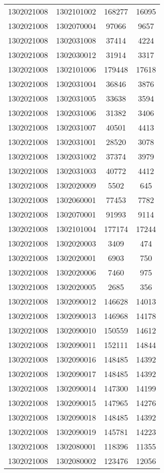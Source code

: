 \begin{longtable}[h]{llcc}
		1302021008 & 1302101002 & 168277 & 16095\\
		1302021008 & 1302070004 & 97066 & 9657\\
		1302021008 & 1302031008 & 37414 & 4224\\
		1302021008 & 1302030012 & 31914 & 3317\\
		1302021008 & 1302101006 & 179448 & 17618\\
		1302021008 & 1302031004 & 36846 & 3876\\
		1302021008 & 1302031005 & 33638 & 3594\\
		1302021008 & 1302031006 & 31382 & 3406\\
		1302021008 & 1302031007 & 40501 & 4413\\
		1302021008 & 1302031001 & 28520 & 3078\\
		1302021008 & 1302031002 & 37374 & 3979\\
		1302021008 & 1302031003 & 40772 & 4412\\
		1302021008 & 1302020009 & 5502 & 645\\
		1302021008 & 1302060001 & 77453 & 7782\\
		1302021008 & 1302070001 & 91993 & 9114\\
		1302021008 & 1302101004 & 177174 & 17244\\
		1302021008 & 1302020003 & 3409 & 474\\
		1302021008 & 1302020001 & 6903 & 750\\
		1302021008 & 1302020006 & 7460 & 975\\
		1302021008 & 1302020005 & 2685 & 356\\
		1302021008 & 1302090012 & 146628 & 14013\\
		1302021008 & 1302090013 & 146968 & 14178\\
		1302021008 & 1302090010 & 150559 & 14612\\
		1302021008 & 1302090011 & 152111 & 14844\\
		1302021008 & 1302090016 & 148485 & 14392\\
		1302021008 & 1302090017 & 148485 & 14392\\
		1302021008 & 1302090014 & 147300 & 14199\\
		1302021008 & 1302090015 & 147965 & 14276\\
		1302021008 & 1302090018 & 148485 & 14392\\
		1302021008 & 1302090019 & 145781 & 14223\\
		1302021008 & 1302080001 & 118396 & 11355\\
		1302021008 & 1302080002 & 123476 & 12056\\

\end{longtable}
